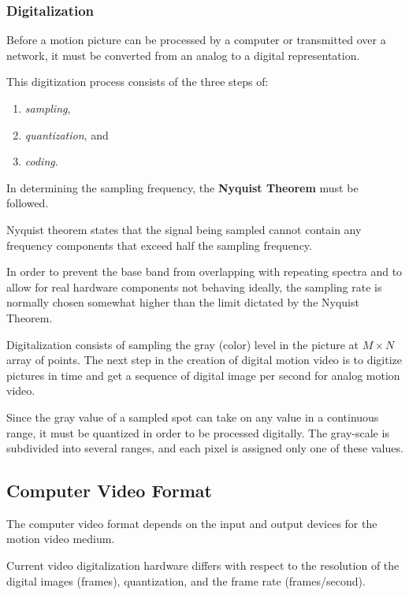 \subsubsection*{Digitalization}
Before a motion picture can be processed by a computer or transmitted over a network, it must be converted from an analog to a digital representation.

This digitization process consists of the three steps of:
\begin{multicols}{3}
	\begin{enumerate}
		\item \textit{sampling},
		\item \textit{quantization}, and
		\item \textit{coding}.
	\end{enumerate}
\end{multicols}

In determining the sampling frequency, the \textbf{Nyquist Theorem} must be followed.
 
Nyquist theorem states that the signal being sampled cannot contain any frequency components that exceed half the sampling frequency. 

In order to prevent the base band from overlapping with repeating spectra and to allow for real hardware components not behaving ideally, the sampling rate is normally chosen somewhat higher than the limit dictated by the Nyquist Theorem.

Digitalization consists of sampling the gray (color) level in the picture at $ M \times N $ array of points. The next step in the creation of digital motion video is to digitize pictures in time and get a sequence of digital image per second for analog motion video.

Since the gray value of a sampled spot can take on any value in a continuous range, it must be quantized in order to be processed digitally. The gray-scale is subdivided into several ranges, and each pixel is assigned only one of these values.


\subsection{Computer Video Format}
The computer video format depends on the input and output devices for the motion video medium.

Current video digitalization hardware differs with respect to the resolution of the digital images (frames), quantization, and the frame rate (frames/second).

